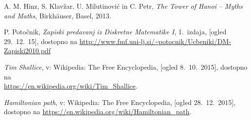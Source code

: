 \documentclass[12pt,a4paper]{amsart}
\theoremstyle{definition} %
\theoremstyle{plain} %
\begin{document}
\begin{thebibliography}{99}

 A. M. Hinz, S. Klavžar, U. Milutinović in C. Petr, \emph{The Tower of Hanoi – Myths and Maths}, Birkhäuser, Basel, 2013.

 P. Potočnik, \emph{Zapiski predavanj iz Diskretne Matematike I}, 1.~izdaja, [ogled 29.~12.~15], dostopno na \url{http://www.fmf.uni-lj.si/~potocnik/Ucbeniki/DM-Zapiski2010.pdf}

 \emph{Tim Shallice}, v: Wikipedia: The Free Encyclopedia, [ogled 8.~10.~2015], dostopno na\\ \url{https://en.wikipedia.org/wiki/Tim_Shallice}.

 \emph{Hamiltonian path}, v: Wikipedia: The Free Encyclopedia, [ogled 28.~12.~2015], dostopno na \url{https://en.wikipedia.org/wiki/Hamiltonian_path}.
\end{thebibliography}
\end{document}
